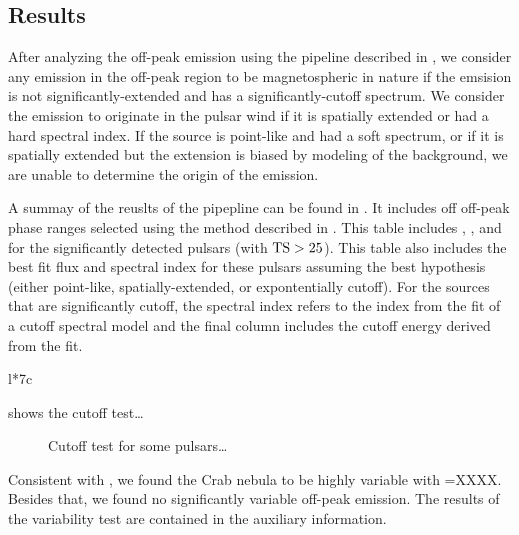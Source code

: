 \subsection{Results}

After analyzing the off-peak emission using the pipeline described
in , we consider any emission in the
off-peak region to be magnetospheric in nature if the emsision is
not significantly-extended and has a significantly-cutoff spectrum.
We consider the emission to originate in the pulsar wind if it is
spatially extended or had a hard spectral index.
If the source is point-like and had a soft spectrum, or if it 
is spatially extended but the extension is biased by modeling
of the background, we are unable to determine the origin of the emission.

A summay of the reuslts of the pipepline can be found in .
It includes off off-peak phase ranges selected using the method described
in .
This table includes \ts, \tsext, and \tscut
for the significantly detected pulsars (with $\text{TS}>25$).
This table also includes the best fit flux and spectral index for these pulsars assuming
the best hypothesis (either point-like, spatially-extended, or expontentially cutoff).
For the sources that are significantly cutoff, the spectral index refers to the index
from the fit of a cutoff spectral model and the final column includes the cutoff energy derived from the fit.

\begin{deluxetable}{l*{7}c}
\tabletypesize{\scriptsize}

\end{deluxetable}



 shows the cutoff test\ldots

\begin{figure}
  \ifdefined\bwfigures
  \else
  \fi
  \caption{Cutoff test for some pulsars\dots}
  \label{fig:cutoff_test}
\end{figure}


Consistent with \citep{LAT_Collaboration_Crab_Flare_2011}, we found
the Crab nebula to be highly variable with \tsvar=XXXX.  Besides that,
we found no significantly variable off-peak emission.  The results of
the variability test are contained in the auxiliary information.

